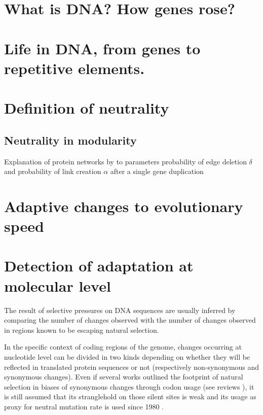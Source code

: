 

\section{What is DNA? How genes rose?}
\section{Life in DNA, from genes to repetitive elements.}
\section{Definition of neutrality}
\subsection{Neutrality in modularity}

Explanation of protein networks by to parameters probability of edge deletion $\delta$ and probability of link creation $\alpha$ after a single gene duplication \cite{Sole2008}

\section{Adaptive changes to evolutionary speed}

\section{Detection of adaptation at molecular level}

The result of selective pressures on DNA sequences are usually inferred by comparing the number of changes observed with the number of changes observed in regions known to be escaping natural selection.

In the specific context of coding regions of the genome, changes occurring at nucleotide level can be divided in two kinds depending on whether they will be reflected in translated protein sequences or not (respectively non-synonymous and synonymous changes). Even if several works outlined the footprint of natural selection in biases of synonymous changes through codon usage (see reviews \cite{Hershberg2008,Plotkin2011}), it is still assumed that its stranglehold on those silent sites is weak  \cite{Yang2008} and its usage as proxy for neutral mutation rate is used since 1980 \cite{Miyata1980}.

